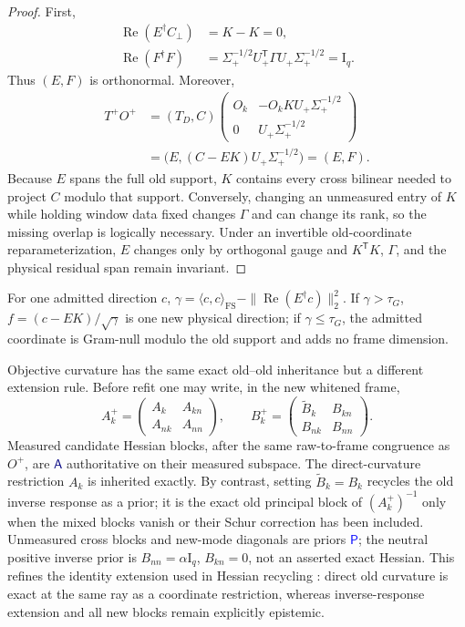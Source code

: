 \documentclass[10pt,twocolumn]{article}
\theoremstyle{definition}
\theoremstyle{remark}
\newcommand{\Id}{\mathrm I}
\newcommand{\Rea}{\operatorname{Re}}
\newcommand{\FS}{\mathrm{FS}}
\newcommand{\A}{\mathsf A}
\newcommand{\status}[2]{\textcolor{#1}{\ensuremath{\boxed{\mathsf{#2}}}}}
\begin{document}
\begin{proof}
First,
\begin{align}
 \Rea(E^\dagger C_\perp)&=K-K=0,\nonumber\\
 \Rea(F^\dagger F)
 &=\Sigma_+^{-1/2}U_+^{\mathsf T}\Gamma U_+\Sigma_+^{-1/2}=\Id_q.
\end{align}
Thus $(E,F)$ is orthonormal.  Moreover,
\begin{align}
 T^+O^+
 &=(T_D,C)
 \begin{pmatrix}
 O_k&-O_kKU_+\Sigma_+^{-1/2}\\
 0&U_+\Sigma_+^{-1/2}
 \end{pmatrix}\nonumber\\
 &=\bigl(E,(C-EK)U_+\Sigma_+^{-1/2}\bigr)=(E,F).
\end{align}
Because $E$ spans the full old support, $K$ contains every cross bilinear needed to project $C$ modulo that support.  Conversely, changing an unmeasured entry of $K$ while holding window data fixed changes $\Gamma$ and can change its rank, so the missing overlap is logically necessary.  Under an invertible old-coordinate reparameterization, $E$ changes only by orthogonal gauge and $K^{\mathsf T}K$, $\Gamma$, and the physical residual span remain invariant.
\end{proof}

For one admitted direction $c$, $\gamma=\langle c,c\rangle_{\FS}-\|\Rea(E^\dagger c)\|_2^2$.  If $\gamma>\tau_G$, $f=(c-EK)/\sqrt\gamma$ is one new physical direction; if $\gamma\le\tau_G$, the admitted coordinate is Gram-null modulo the old support and adds no frame dimension.

Objective curvature has the same exact old--old inheritance but a different extension rule.  Before refit one may write, in the new whitened frame,
\begin{equation}
 A_k^+=
 \begin{pmatrix}A_k&A_{kn}\\A_{nk}&A_{nn}\end{pmatrix},\qquad
 B_k^+=
 \begin{pmatrix}\widetilde B_k&B_{kn}\\B_{nk}&B_{nn}\end{pmatrix}.
 \label{eq:curvatureextension}
\end{equation}
Measured candidate Hessian blocks, after the same raw-to-frame congruence as $O^+$, are \status{navy}{A} authoritative on their measured subspace.  The direct-curvature restriction $A_k$ is inherited exactly.  By contrast, setting $\widetilde B_k=B_k$ recycles the old inverse response as a prior; it is the exact old principal block of $(A_k^+)^{-1}$ only when the mixed blocks vanish or their Schur correction has been included.  Unmeasured cross blocks and new-mode diagonals are priors \status{blue}{P}; the neutral positive inverse prior is $B_{nn}=\alpha\Id_q$, $B_{kn}=0$, not an asserted exact Hessian.  This refines the identity extension used in Hessian recycling \cite{Ramoa2025}: direct old curvature is exact at the same ray as a coordinate restriction, whereas inverse-response extension and all new blocks remain explicitly epistemic.
\end{document}
